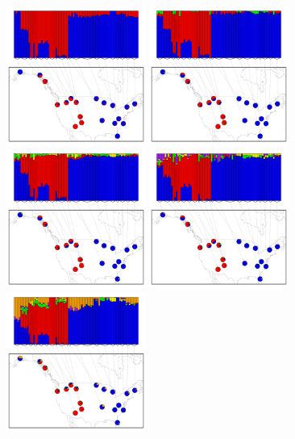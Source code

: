 \documentclass[12pt]{article}
\begin{document}
\begin{figure}
	\centering
			{\includegraphics[width=1.8in,height=1.8in]{figs/bears/bear_sp2.pdf}}
			{\includegraphics[width=1.8in,height=1.8in]{figs/bears/bear_sp3.pdf}}
			{\includegraphics[width=1.8in,height=1.8in]{figs/bears/bear_sp4.pdf}}
			{\includegraphics[width=1.8in,height=1.8in]{figs/bears/bear_sp5.pdf}}
			{\includegraphics[width=1.8in,height=1.8in]{figs/bears/bear_sp6.pdf}}

\end{figure}
\end{document}
